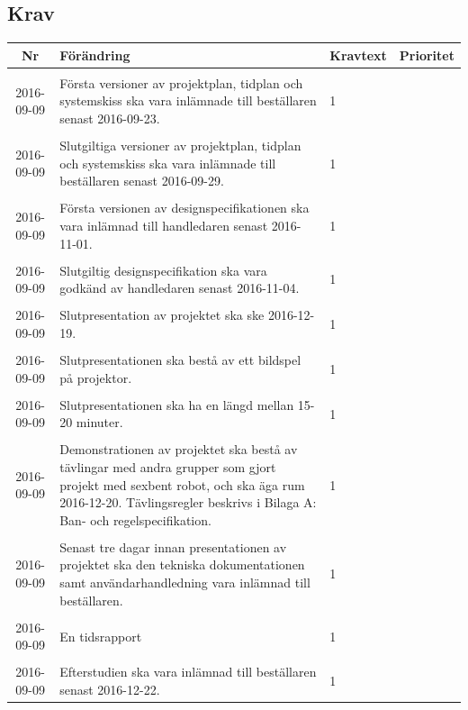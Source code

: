 \documentclass[a4paper,titlepage,12pt]{article}
\newcounter{reqNr}
\newcounter{reqNrII}
\newcommand{\nextReqNrII}{\stepcounter{reqNrII}\arabic{reqNrII}}
\newcommand{\newRequirement}[1] {\pbox{5cm}{Tillagt \\#1}}
\begin{document}
	\subsection{Krav}
	\begin{longtable}[c]{ c l>{\raggedright}p{} l }
		\textbf{Nr} & \textbf{Förändring} & \textbf{Kravtext} & \textbf{Prioritet} 
			\\ \hline

		\nextReqNrII & \newRequirement{2016-09-09} & Första versioner av
        projektplan, tidplan och systemskiss ska vara inlämnade till
        beställaren senast 2016-09-23. & 1
			\\ \midrule

		\nextReqNrII & \newRequirement{2016-09-09} & Slutgiltiga versioner av
        projektplan, tidplan och systemskiss ska vara inlämnade till
        beställaren senast 2016-09-29. & 1
			\\ \midrule

		\nextReqNrII & \newRequirement{2016-09-09} & Första versionen av
			designspecifikationen ska vara inlämnad till handledaren senast
			2016-11-01. & 1
			\\ \hline

		\nextReqNrII & \newRequirement{2016-09-09} & Slutgiltig designspecifikation
			ska vara godkänd av handledaren senast 2016-11-04. & 1
			\\ \hline
			
		\nextReqNrII & \newRequirement{2016-09-09} & Slutpresentation av projektet ska
		ske 2016-12-19. & 1
			\\ \hline

		\nextReqNrII & \newRequirement{2016-09-09} & Slutpresentationen ska bestå av
		ett bildspel på projektor. & 1
			\\ \hline

		\nextReqNrII & \newRequirement{2016-09-09} & Slutpresentationen ska ha en
		längd mellan 15-20 minuter. & 1
			\\ \hline

		\nextReqNrII & \newRequirement{2016-09-09} & Demonstrationen av projektet ska
		bestå av tävlingar med andra grupper som gjort projekt med sexbent
		robot, och ska äga rum 2016-12-20. Tävlingsregler beskrivs i Bilaga
		A: Ban- och regelspecifikation. & 1
			\\ \hline

		\nextReqNrII & \newRequirement{2016-09-09} & Senast tre dagar innan
			presentationen av projektet ska den tekniska dokumentationen
			samt användarhandledning vara inlämnad till beställaren. & 1
			\\ \hline

		\nextReqNrII & \newRequirement{2016-09-09} & En tidsrapport & 1
			\\ \hline

		\nextReqNrII & \newRequirement{2016-09-09} & Efterstudien ska vara inlämnad
		till beställaren senast 2016-12-22. & 1
			\\ 

	\end{longtable}
	
\end{document}
